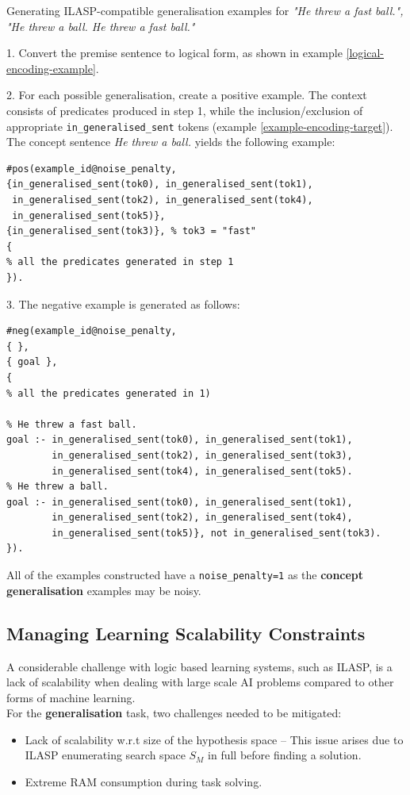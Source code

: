 \begin{example}
Generating ILASP-compatible generalisation examples for \textit{"He threw a fast ball.", "He threw a ball. He threw a fast ball."}

1. Convert the premise sentence to logical form, as shown in example \ref{logical-encoding-example}.

2. For each possible generalisation, create a positive example. The context consists of predicates produced in step 1, while the inclusion/exclusion of appropriate \verb+in_generalised_sent+ tokens (example \ref{example-encoding-target}). The concept sentence \textit{He threw a ball.} yields the following example:
\begin{verbatim}
#pos(example_id@noise_penalty,
{in_generalised_sent(tok0), in_generalised_sent(tok1), 
 in_generalised_sent(tok2), in_generalised_sent(tok4), 
 in_generalised_sent(tok5)},
{in_generalised_sent(tok3)}, % tok3 = "fast"
{
% all the predicates generated in step 1
}).
\end{verbatim}

3. The negative example is generated as follows:
\begin{verbatim}
#neg(example_id@noise_penalty,
{ },
{ goal },
{
% all the predicates generated in 1)

% He threw a fast ball.
goal :- in_generalised_sent(tok0), in_generalised_sent(tok1), 
        in_generalised_sent(tok2), in_generalised_sent(tok3), 
        in_generalised_sent(tok4), in_generalised_sent(tok5).
% He threw a ball.
goal :- in_generalised_sent(tok0), in_generalised_sent(tok1), 
        in_generalised_sent(tok2), in_generalised_sent(tok4), 
        in_generalised_sent(tok5)}, not in_generalised_sent(tok3).
}).
\end{verbatim}
\end{example}

All of the examples constructed have a \verb+noise_penalty=1+ as the \textbf{concept generalisation} examples may be noisy.


\subsection{Managing Learning Scalability Constraints}

A considerable challenge with logic based learning systems, such as ILASP, is a lack of scalability when dealing with large scale AI problems compared to other forms of machine learning. \\
For the \textbf{generalisation} task, two challenges needed to be mitigated: 
\begin{itemize}
    \item Lack of scalability w.r.t size of the hypothesis space -- This issue arises due to ILASP enumerating search space $S_M$ in full before finding a solution.
    \item Extreme RAM consumption during task solving.
\end{itemize}

